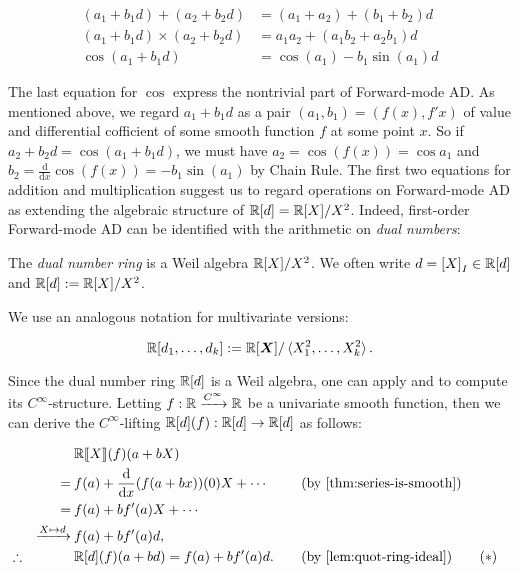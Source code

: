 \begin{align*}
  (a_1 + b_1 d) + (a_2 + b_2 d) &= (a_1 + a_2) + (b_1 + b_2)d\\
  (a_1 + b_1 d) \times (a_2 + b_2 d) &= a_1 a_2 + (a_1 b_2 + a_2 b_1)d\\
  \cos(a_1 + b_1 d) &= \cos(a_1) - b_1 \sin(a_1) d
\end{align*}

The last equation for $\cos$ express the nontrivial part of Forward-mode AD.
As mentioned above, we regard $a_1 + b_1 d$ as a pair $(a_1, b_1) = (f(x), f'x)$ of value and differential cofficient of some smooth function $f$ at some point $x$.
So if $a_2 + b_2 d = \cos(a_1 + b_1 d)$, we must have $a_2 = \cos(f(x)) = \cos a_1$ and $b_2 = \frac{\mathrm d}{\mathrm{d} x} \cos(f(x)) = -b_1 \sin(a_1)$ by Chain Rule.
The first two equations for addition and multiplication suggest us to regard operations on Forward-mode AD as extending the algebraic structure of $\mathbb{R}[d] = \mathbb{R}[X]/X^2$.
Indeed, first-order Forward-mode AD can be identified with the arithmetic on \emph{dual numbers}:
\begin{definition}
  The \emph{dual number ring} is a Weil algebra $\mathbb{R}[X]/{X^2}$.
  We often write $d = {[X]}_I \in \mathbb{R}[d]$ and $\mathbb{R}[d] \mathrel{:=} \mathbb{R}[X]/{X^2}$.

  We use an analogous notation for multivariate versions:
  
  \[
    \mathbb{R}[d_1, \dots, d_k] \mathrel{:=} \mathbb{R}[\boldsymbol{X}]/\braket{X_1^2, \dots, X_k^2}.
  \]
\end{definition}

Since the dual number ring $\mathbb{R}[d]$ is a Weil algebra, one can apply  and  to compute its $C^\infty$-structure.
Letting $f: \mathbb{R} \xrightarrow{C^\infty} \mathbb{R}$ be a univariate smooth function, then we can derive the $C^\infty$-lifting $\mathbb{R}[d](f): \mathbb{R}[d] \to \mathbb{R}[d]$ as follows:

\begin{alignat*}{3}
  &&&\R\llbracket{}X\rrbracket(f)(a + bX) \\
  &&=\:&f(a) + \frac{\mathrm d}{\mathrm{d} x}(f(a + bx))(0) X + \cdots
  &\quad&(\text{by \Cref{thm:series-is-smooth}})\\
  &&=\:&f(a) + b f'(a) X + \cdots\\
  &&\xrightarrow{X \mapsto d}\:&f(a) + bf'(a) d,\\
  &\therefore&& \R[d](f)(a + bd) = f(a) + b f'(a) d.
  && (\text{by \Cref{lem:quot-ring-ideal}}) \tag{\ensuremath{\ast}}
  \label{eqn:dual-smooth}
\end{alignat*}

